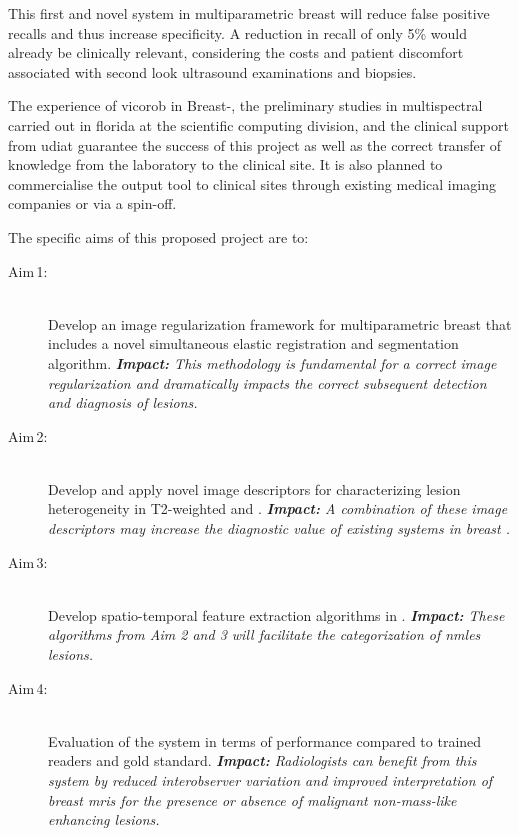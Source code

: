 \documentclass[a4paper,11pt]{article}
\begin{document}
This first and novel \cad system in multiparametric breast \mri will reduce false positive recalls and thus increase specificity.
 A reduction in recall of only 5\% would already be clinically relevant, considering the costs and patient discomfort associated with second look ultrasound examinations and biopsies.

The experience of \acs{vicorob} in Breast-\cad, the preliminary studies in multispectral \mri carried out in \acs{florida} at the scientific computing division, and the clinical support from \acs{udiat} guarantee the success of this project as well as the correct transfer of knowledge from the laboratory to the clinical site.
It is also planned to commercialise the output \cad tool to clinical sites through existing medical imaging companies or via a spin-off.


The specific aims of this proposed project are to:
\begin{description}
\item [Aim\,1:]
  \hfill \\
Develop an image regularization framework for multiparametric breast \mri that includes a novel simultaneous elastic registration and segmentation algorithm.
  \emph{\textbf{Impact:} This methodology is fundamental for a correct image regularization and dramatically impacts the correct subsequent detection and diagnosis of \nmle lesions.}

  \item [Aim\,2:]
  \hfill \\
  Develop and apply novel image descriptors for characterizing lesion heterogeneity in T2-weighted \mri and \dwi.
  \emph{\textbf{Impact:} A combination of these image descriptors may increase the diagnostic value of existing \cad systems in breast \mri.}

  \item [Aim\,3:]
  \hfill \\
    Develop spatio-temporal feature extraction algorithms in \cemri.  \emph{\textbf{Impact:} These algorithms from Aim 2 and 3 will facilitate the categorization of \acp{nmle} lesions.}

  \item [Aim\,4:]
  \hfill \\
    Evaluation of the \cad system in terms of performance compared to trained readers and gold standard.
    \emph{\textbf{Impact:} Radiologists can benefit from this system by reduced interobserver variation and improved interpretation of breast \acp{mri} for the presence or absence of malignant non-mass-like enhancing lesions.}

\end{description}
\end{document}
